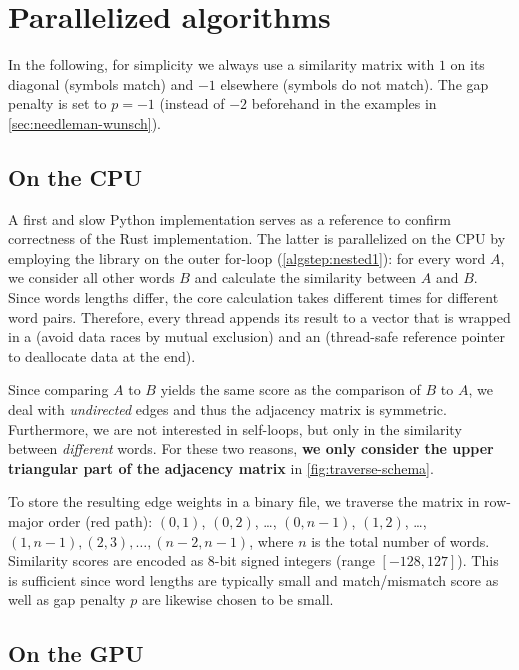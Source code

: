 \section{Parallelized algorithms}
\label{sec:impl}

In the following, for simplicity we always use a similarity matrix with $1$ on its diagonal (symbols match) and $-1$ elsewhere (symbols do not match). The gap penalty is set to $p=-1$ (instead of $-2$ beforehand in the examples in \autoref{sec:needleman-wunsch}).


\subsection{On the CPU}

A first and slow Python implementation serves as a reference to confirm correctness of the Rust implementation. The latter is parallelized on the CPU by employing the  library on the outer for-loop (\autoref{algstep:nested1}): for every word $A$, we consider all other words $B$ and calculate the similarity between $A$ and $B$. Since words lengths differ, the core calculation takes different times for different word pairs. Therefore, every thread appends its result to a vector that is wrapped in a  (avoid data races by mutual exclusion) and an  (thread-safe reference pointer to deallocate data at the end).

Since comparing $A$ to $B$ yields the same score as the comparison of $B$ to $A$, we deal with \textit{undirected} edges and thus the adjacency matrix is symmetric. Furthermore, we are not interested in self-loops, but only in the similarity between \textit{different} words. For these two reasons, \textbf{we only consider the upper triangular part of the adjacency matrix} in \autoref{fig:traverse-schema}.

To store the resulting edge weights in a binary file, we traverse the matrix in row-major order (red path): $(0,1)$, $(0,2)$, \ldots, $(0,n-1)$, $(1,2)$, \ldots, $(1,n-1), (2,3), \ldots, (n-2,n-1)$, where $n$ is the total number of words. Similarity scores are encoded as 8-bit signed integers (range $[-128,127]$). This is sufficient since word lengths are typically small and match/mismatch score as well as gap penalty $p$ are likewise chosen to be small.


\subsection{On the GPU}

